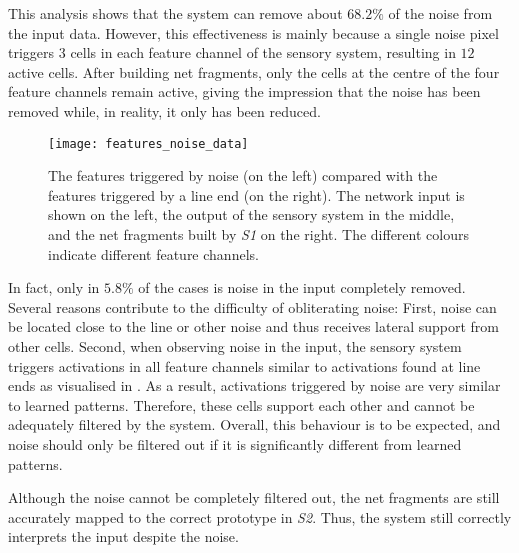 This analysis shows that the system can remove about $68.2\%$ of the noise from the input data. However, this effectiveness is mainly because a single noise pixel triggers $3$ cells in each feature channel of the sensory system, resulting in $12$ active cells. After building net fragments, only the cells at the centre of the four feature channels remain active, giving the impression that the noise has been removed while, in reality, it only has been reduced.

\begin{figure}[h]
    \centering
    \texttt{[image: features\_noise\_data]}
    \caption[Features triggered by noise]{The features triggered by noise (on the left) compared with the features triggered by a line end (on the right). The network input is shown on the left, the output of the sensory system in the middle, and the net fragments built by \emph{S1} on the right. The different colours indicate different feature channels.}
\end{figure}
%
In fact, only in $5.8\%$ of the cases is noise in the input completely removed.
Several reasons contribute to the difficulty of obliterating noise: First, noise can be located close to the line or other noise and thus receives lateral support from other cells. Second, when observing noise in the input, the sensory system triggers activations in all feature channels similar to activations found at line ends as visualised in .
As a result, activations triggered by noise are very similar to learned patterns. Therefore, these cells support each other and cannot be adequately filtered by the system.
Overall, this behaviour is to be expected, and noise should only be filtered out if it is significantly different from learned patterns.

Although the noise cannot be completely filtered out, the net fragments are still accurately mapped to the correct prototype in \emph{S2}. Thus, the system still correctly interprets the input despite the noise.

